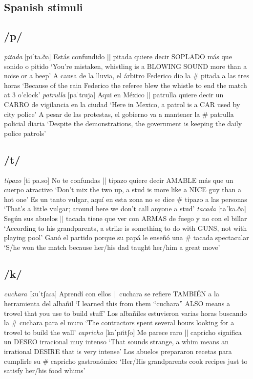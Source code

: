 \documentclass[output=paper]{langscibook}
\begin{document}
\begin{paperappendix}
\section{Spanish stimuli}\label{B}\largerpage[2]

\subsection{/p/}
\ea   \textit{pitada} [piˈta.ða] 
\ea   Estás confundido || pitada quiere decir SOPLADO más que sonido o pitido
\glt `You’re mistaken, whistling is a BLOWING SOUND more than a noise or a beep'
\ex   A causa de la lluvia, el árbitro Federico dio la \# pitada a las tres horas
\glt `Because of the rain Federico the referee blew the whistle to end the match at 3 o’clock'
\z
\ex  \textit{patrulla} [paˈtɾuja]
\ea   Aqui en México || patrulla quiere decir un CARRO de vigilancia en la ciudad
\glt `Here in Mexico, a patrol is a CAR used by city police'
\ex   A pesar de las protestas, el gobierno va a mantener la \# patrulla policial diaria
\glt `Despite the demonstrations, the government is keeping the daily police patrols'
\z
\z

\subsection{/t/}
\ea \textit{tipazo} [tiˈpa.so]
\ea No te confundas || tipazo quiere decir AMABLE más que un cuerpo atractivo
\glt`Don’t mix the two up, a stud is more like a NICE guy than a hot one'
\ex Es un tanto vulgar, aquí en esta zona no se dice \# tipazo a las personas
\glt`That’s a little vulgar; around here we don’t call anyone a stud'
\z
\ex \textit{tacada} [taˈka.ða]
\ea Según sus abuelos || tacada tiene que ver con ARMAS de fuego y no con el billar
\glt`According to his grandparents, a strike is something to do with GUNS, not with playing pool'
\ex Ganó el partido porque su papá le enseñó una \# tacada spectacular
\glt`S/he won the match because her/his dad taught her/him a great move'
\z
\z

\subsection{/k/}
\ea \textit{cuchara} [kuˈtʃaɾa]
\ea Aprendí con ellos || cuchara se refiere TAMBIÉN a la herramienta del albañil
\glt`I learned this from them “cuchara” ALSO means a trowel that you use to build stuff'
\ex Los albañiles estuvieron varias horas buscando la \# cuchara para el muro
\glt`The contractors spent several hours looking for a trowel to build the wall'
\z
\ex \textit{capricho} [kaˈpɾitʃo]
\ea Me parece raro || capricho significa un DESEO irracional muy intenso
\glt`That sounds strange, a whim means an irrational DESIRE that is very intense'
\ex Los abuelos prepararon recetas para cumplirle su \# capricho gastronómico
\glt`Her/His grandparents cook recipes just to satisfy her/his food whims'
\z
\z

\end{paperappendix}
\end{document}
